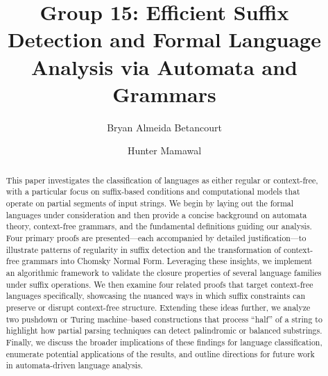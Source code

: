\documentclass[sigconf,anonymous,review]{acmart}
\begin{document}
\title{Group 15: Efficient Suffix Detection and Formal Language Analysis via Automata and Grammars}

\author{Bryan Almeida Betancourt}

\author{Hunter Mamawal}


\renewcommand{\shortauthors}{Trovato et al.}

\begin{abstract}
  This paper investigates the classification of languages as either regular or context-free, with a particular focus on suffix-based conditions and computational models that operate on partial segments of input strings. We begin by laying out the formal languages under consideration and then provide a concise background on automata theory, context-free grammars, and the fundamental definitions guiding our analysis. Four primary proofs are presented—each accompanied by detailed justification—to illustrate patterns of regularity in suffix detection and the transformation of context-free grammars into Chomsky Normal Form. Leveraging these insights, we implement an algorithmic framework to validate the closure properties of several language families under suffix operations. We then examine four related proofs that target context-free languages specifically, showcasing the nuanced ways in which suffix constraints can preserve or disrupt context-free structure. Extending these ideas further, we analyze two pushdown or Turing machine–based constructions that process “half” of a string to highlight how partial parsing techniques can detect palindromic or balanced substrings. Finally, we discuss the broader implications of these findings for language classification, enumerate potential applications of the results, and outline directions for future work in automata-driven language analysis.
\end{abstract}
\end{document}
